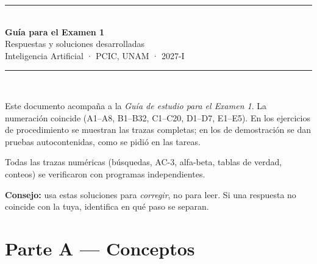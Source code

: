 

\fancyhead[L]{\small\textcolor{gris}{Inteligencia Artificial 2027-I · Guía para el Examen 1}}
\fancyhead[R]{\small\textcolor{verde}{Respuestas}}
\fancyfoot[C]{\small\thepage}



\begin{titlepage}
\centering
\vspace*{1.5cm}
{\color{verde}\rule{\linewidth}{1.2pt}}\\[0.6cm]
{\Huge\bfseries\color{verde} Guía para el Examen 1}\\[0.3cm]
{\LARGE Respuestas y soluciones desarrolladas}\\[0.2cm]
{\large Inteligencia Artificial · PCIC, UNAM · 2027-I}\\[0.4cm]
{\color{verde}\rule{\linewidth}{1.2pt}}\\[1.2cm]
\begin{minipage}{0.84\linewidth}\large
Este documento acompaña a la \emph{Guía de estudio para el Examen 1}. La numeración coincide
(A1–A8, B1–B32, C1–C20, D1–D7, E1–E5). En los ejercicios de procedimiento se muestran las trazas
completas; en los de demostración se dan pruebas autocontenidas, como se pidió en las tareas.

\vspace{0.5cm}
Todas las trazas numéricas (búsquedas, AC-3, alfa-beta, tablas de verdad, conteos) se
verificaron con programas independientes.

\vspace{0.5cm}
\textbf{Consejo:} usa estas soluciones para \emph{corregir}, no para leer. Si una respuesta no
coincide con la tuya, identifica en qué paso se separan.
\end{minipage}
\vfill
\end{titlepage}

\tableofcontents
\newpage

\section{Parte A — Conceptos}

